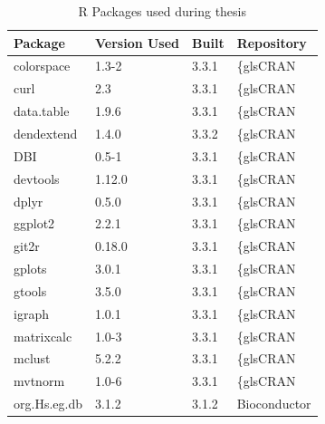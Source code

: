\begin{longtable}{llll}
\caption{R Packages used during thesis}
\label{tab:computers_r_packages}
\\
\multicolumn{1}{l}{\bfseries Package}      & \multicolumn{1}{l}{\bfseries Version Used} & \multicolumn{1}{l}{\bfseries Built} & \multicolumn{1}{l}{\bfseries Repository}      \\
\hline  \rowcolor{black!10}
colorspace   & 1.3-2          & 3.3.1 & \{gls{CRAN}            \\
\rowcolor{black!5}
curl         & 2.3            & 3.3.1 & \{gls{CRAN}            \\
\rowcolor{black!10}
data.table   & 1.9.6          & 3.3.1 & \{gls{CRAN}            \\
\rowcolor{black!5}
dendextend   & 1.4.0          & 3.3.2 & \{gls{CRAN}            \\
\rowcolor{black!10}
DBI          & 0.5-1          & 3.3.1 & \{gls{CRAN}            \\
\rowcolor{black!5}
devtools     & 1.12.0         & 3.3.1 & \{gls{CRAN}            \\
\rowcolor{black!10}
dplyr        & 0.5.0          & 3.3.1 & \{gls{CRAN}            \\
\rowcolor{black!5}
ggplot2      & 2.2.1          & 3.3.1 & \{gls{CRAN}            \\
\rowcolor{black!10}
git2r        & 0.18.0         & 3.3.1 & \{gls{CRAN}            \\
\rowcolor{black!5}
gplots       & 3.0.1          & 3.3.1 & \{gls{CRAN}            \\
\rowcolor{black!10}
gtools       & 3.5.0          & 3.3.1 & \{gls{CRAN}            \\
\rowcolor{black!5}
igraph       & 1.0.1          & 3.3.1 & \{gls{CRAN}            \\
\rowcolor{black!10}
matrixcalc   & 1.0-3          & 3.3.1 & \{gls{CRAN}            \\
\rowcolor{black!5}
mclust       & 5.2.2          & 3.3.1 & \{gls{CRAN}            \\
\rowcolor{black!10}
mvtnorm      & 1.0-6          & 3.3.1 & \{gls{CRAN}            \\
\rowcolor{black!5}
org.Hs.eg.db & 3.1.2          & 3.1.2 & Bioconductor    \\

\end{longtable}
